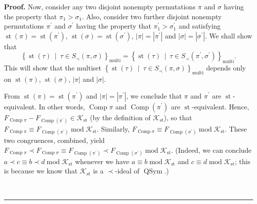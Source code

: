 \documentclass[numbers=enddot,12pt,final,onecolumn,notitlepage]{scrartcl}%
\theoremstyle{definition}
\newenvironment{proof}[1][Proof]{\noindent\textbf{#1.} }{\ \rule{0.5em}{0.5em}}
\newenvironment{verlong}{}{}
\begin{document}
\begin{verlong}
\begin{proof}
Now, consider any two disjoint nonempty permutations $\pi$ and $\sigma$ having
the property that $\pi_{1}>\sigma_{1}$. Also, consider two further disjoint
nonempty permutations $\pi^{\prime}$ and $\sigma^{\prime}$ having the property
that $\pi_{1}^{\prime}>\sigma_{1}^{\prime}$ and satisfying $\operatorname*{st}%
\left(  \pi\right)  =\operatorname*{st}\left(  \pi^{\prime}\right)  $,
$\operatorname*{st}\left(  \sigma\right)  =\operatorname*{st}\left(
\sigma^{\prime}\right)  $, $\left\vert \pi\right\vert =\left\vert \pi^{\prime
}\right\vert $ and $\left\vert \sigma\right\vert =\left\vert \sigma^{\prime
}\right\vert $. We shall show that
\[
\left\{  \operatorname*{st}\left(
\tau\right)  \ \mid\ \tau\in S_{\prec}\left(  \pi,\sigma\right)  \right\}
_{\operatorname*{multi}}=\left\{  \operatorname*{st}\left(  \tau\right)
\ \mid\ \tau\in S_{\prec}\left(  \pi^{\prime},\sigma^{\prime}\right)
\right\}  _{\operatorname*{multi}} .
\]
This will show that the multiset
$\left\{  \operatorname*{st}\left(  \tau\right)  \ \mid\ \tau\in S_{\prec
}\left(  \pi,\sigma\right)  \right\}  _{\operatorname*{multi}}$ depends only
on $\operatorname*{st}\left(  \pi\right)  $, $\operatorname*{st}\left(
\sigma\right)  $, $\left\vert \pi\right\vert $ and $\left\vert \sigma
\right\vert $.

From $\operatorname*{st}\left(  \pi\right)  =\operatorname*{st}\left(
\pi^{\prime}\right)  $ and $\left\vert \pi\right\vert =\left\vert \pi^{\prime
}\right\vert $, we conclude that $\pi$ and $\pi^{\prime}$ are
$\operatorname*{st}$-equivalent. In other words, $\operatorname*{Comp}\pi$ and
$\operatorname*{Comp}\left(  \pi^{\prime}\right)  $ are $\operatorname*{st}%
$-equivalent. Hence, $F_{\operatorname*{Comp}\pi}-F_{\operatorname*{Comp}%
\left(  \pi^{\prime}\right)  }\in\mathcal{K}_{\operatorname*{st}}$ (by the
definition of $\mathcal{K}_{\operatorname*{st}}$), so that
$F_{\operatorname*{Comp}\pi}\equiv F_{\operatorname*{Comp}\left(  \pi^{\prime
}\right)  }\operatorname{mod}\mathcal{K}_{\operatorname*{st}}$. Similarly,
$F_{\operatorname*{Comp}\sigma}\equiv F_{\operatorname*{Comp}\left(
\sigma^{\prime}\right)  }\operatorname{mod}\mathcal{K}_{\operatorname*{st}}$.
These two congruences, combined, yield $F_{\operatorname*{Comp}\pi}\left.
\prec\right.  F_{\operatorname*{Comp}\sigma}\equiv F_{\operatorname*{Comp}%
\left(  \pi^{\prime}\right)  }\left.  \prec\right.  F_{\operatorname*{Comp}%
\left(  \sigma^{\prime}\right)  }\operatorname{mod}\mathcal{K}%
_{\operatorname*{st}}$. (Indeed, we can conclude $a\left.  \prec\right.
c\equiv b\left.  \prec\right.  d\operatorname{mod}\mathcal{K}%
_{\operatorname*{st}}$ whenever we have $a\equiv b\operatorname{mod}%
\mathcal{K}_{\operatorname*{st}}$ and $c\equiv d\operatorname{mod}%
\mathcal{K}_{\operatorname*{st}}$; this is because we know that $\mathcal{K}%
_{\operatorname*{st}}$ is a $\left.  \prec\right.  $-ideal of
$\operatorname*{QSym}$.)


\end{proof}
\end{verlong}
\end{document}
